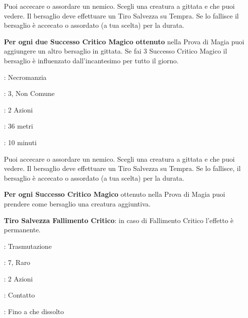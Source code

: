\begin{multicols}{2}
Puoi accecare o assordare un nemico. Scegli una creatura a gittata e che puoi vedere. Il bersaglio deve effettuare un Tiro Salvezza su Tempra. Se lo fallisce il bersaglio è accecato o assordato (a tua scelta) per la durata.

\textbf{Per ogni due Successo Critico Magico ottenuto} nella Prova di Magia puoi aggiungere un altro bersaglio in gittata. Se fai 3 Successo Critico Magico il bersaglio è influenzato dall'incantesimo per tutto il giorno.

\noindent\colorbox{OBSSgold!10}{
\begin{minipage}{0.95\linewidth}
\begin{description}[noitemsep, topsep=0pt, parsep=0pt, partopsep=0pt, leftmargin=0cm, labelwidth=1.3cm]
	\item[\textbf{Lista}]: Necromanzia
	\item[\textbf{Livello}]: 3, Non Comune
	\item[\textbf{Lancio}]: 2 Azioni
	\item[\textbf{Gittata}]: 36 metri
	\item[\textbf{Durata}]: 10 minuti
\end{description}
\end{minipage}}\smallskip

Puoi accecare o assordare un nemico. Scegli una creatura a gittata e che puoi vedere. Il bersaglio deve effettuare un Tiro Salvezza su Tempra. Se lo fallisce, il bersaglio è accecato o assordato (a tua scelta) per la durata.

\textbf{Per ogni Successo Critico Magico} ottenuto nella Prova di Magia puoi prendere come bersaglio una creatura aggiuntiva.

\textbf{Tiro Salvezza Fallimento Critico}: in caso di Fallimento Critico l'effetto è permanente.

\noindent\colorbox{OBSSgold!10}{
\begin{minipage}{0.95\linewidth}
\begin{description}[noitemsep, topsep=0pt, parsep=0pt, partopsep=0pt, leftmargin=0cm, labelwidth=1.3cm]
	\item[\textbf{Lista}]: Trasmutazione
	\item[\textbf{Livello}]: 7, Raro
	\item[\textbf{Lancio}]: 2 Azioni
	\item[\textbf{Gittata}]: Contatto
	\item[\textbf{Durata}]: Fino a che dissolto
\end{description}
\end{minipage}}\smallskip


\end{multicols}
